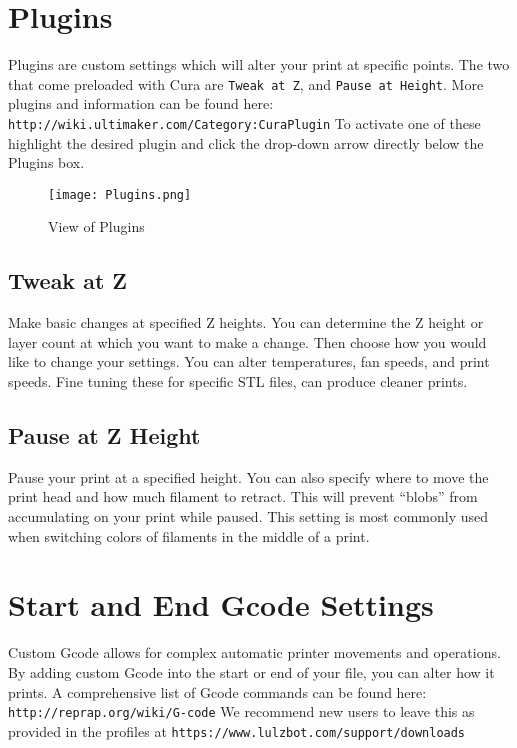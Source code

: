 \section{Plugins}
Plugins are custom settings which will alter your print at specific points. The two that come preloaded with Cura are \texttt{Tweak at Z}, and \texttt{Pause at Height}. More plugins and information can be found here: \texttt{http://wiki.ultimaker.com/Category:CuraPlugin} To activate one of these highlight the desired plugin and click the drop-down arrow directly below the Plugins box. 
\begin{figure}[H]
\centering
\texttt{[image: Plugins.png]}
\caption{View of Plugins}
\label{fig:Plugins}
\end{figure}

\subsection{Tweak at Z}
Make basic changes at specified Z heights. You can determine the Z height or layer count at which you want to make a change. Then choose how you would like to change your settings. You can alter temperatures, fan speeds, and print speeds. Fine tuning these for specific STL files, can produce cleaner prints.

\subsection{Pause at Z Height}
Pause your print at a specified height. You can also specify where to move the print head and how much filament to retract. This will prevent “blobs” from accumulating on your print while paused. This setting is most commonly used when switching colors of filaments in the middle of a print.

\section{Start and End Gcode Settings}
Custom Gcode allows for complex automatic printer movements and operations. By adding custom Gcode into the start or end of your file, you can alter how it prints. A comprehensive list of Gcode commands can be found here: \texttt{http://reprap.org/wiki/G-code} We recommend new users to leave this as provided in the profiles at \texttt{https://www.lulzbot.com/support/downloads}

